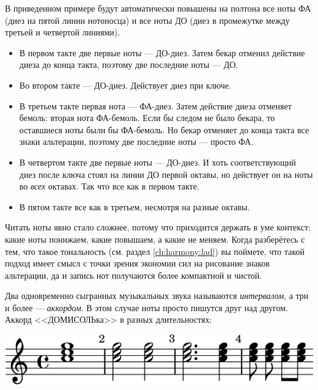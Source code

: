 В приведенном примере будут автоматически повышены на полтона все ноты ФА (диез на пятой линии нотоносца) и все ноты ДО (диез в промежутке между третьей и четвертой линиями).
\begin{itemize}
    \item В первом такте две первые ноты --- ДО-диез. Затем бекар отменил действие диеза до конца такта, поэтому две последние ноты --- ДО.
    
    \item Во втором такте --- ДО-диез. Действует диез при ключе.
    
    \item В третьем такте первая нота --- ФА-диез. Затем действие диеза отменяет бемоль: вторая нота ФА-бемоль. Если бы следом не было бекара, то оставшиеся ноты были бы ФА-бемоль. Но бекар отменяет до конца такта все знаки альтерации, поэтому две последние ноты --- просто ФА.
    
    \item В четвертом такте две первые ноты --- ДО-диез. И хоть соответствующий диез после ключа стоял на линии ДО первой октавы, но действует он на ноты во \emph{всех} октавах. Так что все как в первом такте.
    
    \item В пятом такте все как в третьем, несмотря на разные октавы.
\end{itemize}

Читать ноты явно стало сложнее, потому что приходится держать в уме контекст: какие ноты понижаем, какие повышаем, а какие не меняем. Когда разберётесь с тем, что такое тональность (см. раздел \ref{ch:harmony:lad}) вы поймете, что такой подход имеет смысл с точки зрения экономии сил на рисование знаков альтерации, да и запись нот получаются более компактной и чистой.

Два одновременно сыгранных музыкальных звука называются \emph{интервалом}, а три и более --- \emph{аккордом}. В этом случае ноты просто пишутся друг над другом. Аккорд <<ДОМИСОЛЬка>> в разных длительностях:
\begin{center}
    \includegraphics{fig/notes/chord}
\end{center}

